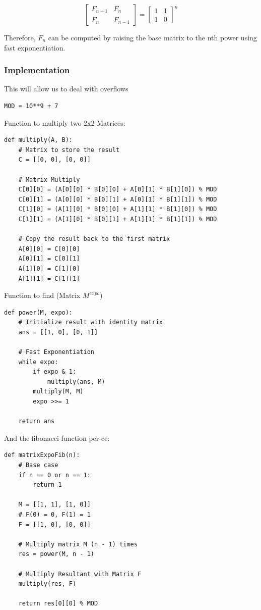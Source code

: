 \documentclass[a4paper, 12pt]{article}
\begin{document}
\[ \begin{bmatrix} F_{n+1} & F_n \\ F_n & F_{n-1} \end{bmatrix} = \begin{bmatrix} 1 & 1 \\ 1 & 0 \end{bmatrix}^n \]

Therefore, \(F_n\) can be computed by raising the base matrix to the nth power using fast exponentiation.
\subsubsection{Implementation}
\label{sec:org518793c}
This will allow us to deal with overflows
\begin{verbatim}
MOD = 10**9 + 7
\end{verbatim}

Function to multiply two 2x2 Matrices:
\begin{verbatim}
def multiply(A, B):
    # Matrix to store the result
    C = [[0, 0], [0, 0]]

    # Matrix Multiply
    C[0][0] = (A[0][0] * B[0][0] + A[0][1] * B[1][0]) % MOD
    C[0][1] = (A[0][0] * B[0][1] + A[0][1] * B[1][1]) % MOD
    C[1][0] = (A[1][0] * B[0][0] + A[1][1] * B[1][0]) % MOD
    C[1][1] = (A[1][0] * B[0][1] + A[1][1] * B[1][1]) % MOD

    # Copy the result back to the first matrix
    A[0][0] = C[0][0]
    A[0][1] = C[0][1]
    A[1][0] = C[1][0]
    A[1][1] = C[1][1]
\end{verbatim}

Function to find (Matrix \(M ^{expo}\))
\begin{verbatim}
def power(M, expo):
    # Initialize result with identity matrix
    ans = [[1, 0], [0, 1]]

    # Fast Exponentiation
    while expo:
        if expo & 1:
            multiply(ans, M)
        multiply(M, M)
        expo >>= 1

    return ans
\end{verbatim}

And the fibonacci function per-ce:
\begin{verbatim}
def matrixExpoFib(n):
    # Base case
    if n == 0 or n == 1:
        return 1

    M = [[1, 1], [1, 0]]
    # F(0) = 0, F(1) = 1
    F = [[1, 0], [0, 0]]

    # Multiply matrix M (n - 1) times
    res = power(M, n - 1)

    # Multiply Resultant with Matrix F
    multiply(res, F)

    return res[0][0] % MOD
\end{verbatim}
\end{document}
